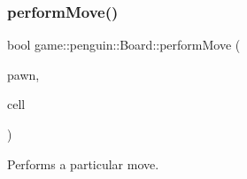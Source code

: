 \subsubsection{\texorpdfstring{perform\+Move()}{performMove()}}
{\footnotesize\ttfamily bool game\+::penguin\+::\+Board\+::perform\+Move (\begin{DoxyParamCaption}\item[{\hyperlink{classgame_1_1penguin_1_1_penguin_pawn}{Penguin\+Pawn} $\ast$}]{pawn,  }\item[{\hyperlink{classgame_1_1penguin_1_1_board_cell}{Board\+Cell} $\ast$}]{cell }\end{DoxyParamCaption})\hspace{0.3cm}{\ttfamily [override]}}



Performs a particular move. 



